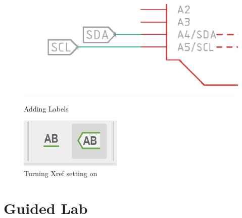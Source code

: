 \documentclass{article}
\begin{document}
\begin{figure}[H]
  \centering
  \begin{minipage}[b]{0.3\textwidth}
    \includegraphics[width=\textwidth]{xref.png}
    \caption{Adding Labels}
  \end{minipage}
  \hfill
  \begin{minipage}[b]{0.3\textwidth}
    \includegraphics[width=\textwidth]{xrefsymbol.png}
    \caption{Turning Xref setting on}
  \end{minipage}
\end{figure}

\section{Guided Lab}
\end{document}
